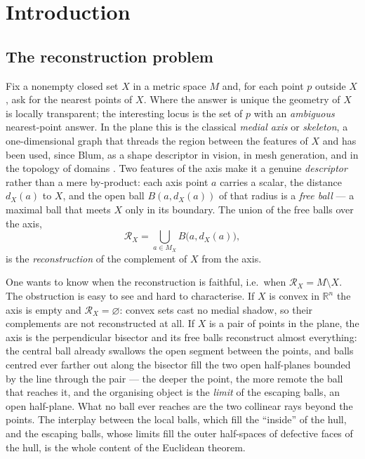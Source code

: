 \documentclass[11pt]{article}
\theoremstyle{remark}
\newcommand{\R}{\mathbb{R}}
\newcommand{\X}{X}
\newcommand{\Mx}{M_{\X}}
\newcommand{\Rx}{\mathcal{R}_{\X}}
\newcommand{\dX}{d_{\X}}
\begin{document}
\section{Introduction}\label{sec:intro}

\subsection{The reconstruction problem}

Fix a nonempty closed set $\X$ in a metric space $M$ and, for each
point
$p$ outside $\X$, ask for the nearest points of $\X$. Where the answer
is unique the geometry of $\X$ is locally transparent; the interesting
locus is the set of $p$ with an \emph{ambiguous} nearest-point
answer. In the plane this is the classical \emph{medial axis} or
\emph{skeleton}, a one-dimensional graph that threads the region
between the features of $\X$ and has been used, since Blum, as a
shape descriptor in vision, in mesh generation, and in the topology of
domains \cite{Lie}. Two features of the axis make it a genuine
\emph{descriptor} rather than a mere by-product: each axis point $a$
carries a scalar, the distance $\dX(a)$ to $\X$, and the open ball
$B(a,\dX(a))$ of that radius is a \emph{free ball} --- a maximal ball
that meets $\X$ only in its boundary. The union of the free balls over
the axis,
\[
  \Rx=\bigcup_{a\in\Mx}B\bigl(a,\dX(a)\bigr),
\]
is the \emph{reconstruction} of the complement of $\X$ from the axis.

One wants to know when the reconstruction is faithful, i.e.\ when
$\Rx=M\setminus\X$. The obstruction is easy to see and hard to
characterise. If $\X$ is convex in $\R^{n}$ the axis is empty and
$\Rx=\varnothing$: convex sets cast no medial shadow, so their
complements are not reconstructed at all. If $\X$ is a pair of points
in the plane, the axis is the perpendicular bisector and its free
balls reconstruct almost everything: the central ball already
swallows the open segment between the points, and balls centred ever
farther out along the bisector fill the two open half-planes bounded
by the line through the pair --- the deeper the point, the more
remote the ball that reaches it, and the organising object is the
\emph{limit} of the escaping balls, an open half-plane. What no ball
ever reaches are the two collinear rays beyond the points. The
interplay between the local balls, which fill the ``inside'' of the
hull, and the escaping balls, whose limits fill the outer half-spaces
of defective faces of the hull, is the whole content of the Euclidean
theorem.
\end{document}
